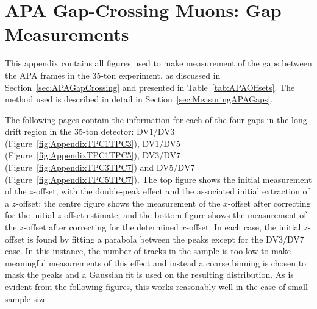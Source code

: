 
\graphicspath{{AppendixAPAGap/Figs/}}

\chapter{APA Gap-Crossing Muons: Gap Measurements}\label{appen:APAGap}

This appendix contains all figures used to make measurement of the gaps between the APA frames in the 35-ton experiment, as discussed in Section~\ref{sec:APAGapCrossing} and presented in Table~\ref{tab:APAOffsets}.  The method used is described in detail in Section~\ref{sec:MeasuringAPAGaps}.

The following pages contain the information for each of the four gaps in the long drift region in the 35-ton detector: DV1/DV3 (Figure~\ref{fig:AppendixTPC1TPC3}), DV1/DV5 (Figure~\ref{fig:AppendixTPC1TPC5}), DV3/DV7 (Figure~\ref{fig:AppendixTPC3TPC7}) and DV5/DV7 (Figure~\ref{fig:AppendixTPC5TPC7}).  The top figure shows the initial measurement of the $z$-offset, with the double-peak effect and the associated initial extraction of a $z$-offset; the centre figure shows the measurement of the $x$-offset after correcting for the initial $z$-offset estimate; and the bottom figure shows the measurement of the $z$-offset after correcting for the determined $x$-offset.  In each case, the initial $z$-offset is found by fitting a parabola between the peaks except for the DV3/DV7 case.  In this instance, the number of tracks in the sample is too low to make meaningful measurements of this effect and instead a coarse binning is chosen to mask the peaks and a Gaussian fit is used on the resulting distribution.  As is evident from the following figures, this works reasonably well in the case of small sample size.

